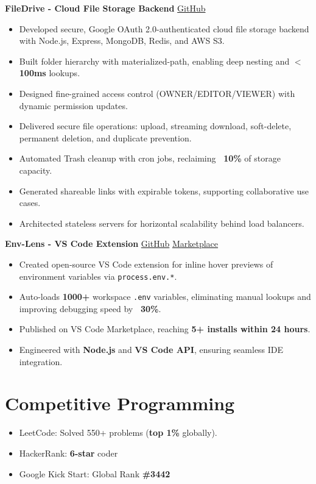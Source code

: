 \documentclass[a4paper,10pt]{article}
\newcommand{\resumeItem}[1]{\item\small{#1}}
\begin{document}
\textbf{FileDrive - Cloud File Storage Backend} \hfill \href{https://github.com/mohankumarkadiri/File-Drive}{GitHub}
\vspace{6pt}
\begin{itemize}[leftmargin=*,itemsep=2pt]
  \resumeItem{Developed secure, Google OAuth 2.0-authenticated cloud file storage backend with Node.js, Express, MongoDB, Redis, and AWS S3.}
  \resumeItem{Built folder hierarchy with materialized-path, enabling deep nesting and \textbf{$<$100ms} lookups.}
  \resumeItem{Designed fine-grained access control (OWNER/EDITOR/VIEWER) with dynamic permission updates.}
  \resumeItem{Delivered secure file operations: upload, streaming download, soft-delete, permanent deletion, and duplicate prevention.}
  \resumeItem{Automated Trash cleanup with cron jobs, reclaiming \textbf{~10\%} of storage capacity.}
  \resumeItem{Generated shareable links with expirable tokens, supporting collaborative use cases.}
  \resumeItem{Architected stateless servers for horizontal scalability behind load balancers.}
\end{itemize}

\vspace{6pt}

\textbf{Env-Lens - VS Code Extension} \hfill
\href{https://github.com/mohankumarkadiri/env-lens}{GitHub} \textbar{} \href{https://marketplace.visualstudio.com/items?itemName=mohankumarkadiri.env-lens&ssr=false}{Marketplace}

\vspace{3pt}
\begin{itemize}[leftmargin=*,itemsep=2pt]
  \resumeItem{Created open-source VS Code extension for inline hover previews of environment variables via \texttt{process.env.*}.}
  \resumeItem{Auto-loads \textbf{1000+} workspace \texttt{.env} variables, eliminating manual lookups and improving debugging speed by \textbf{~30\%}.}
  \resumeItem{Published on VS Code Marketplace, reaching \textbf{5+ installs within 24 hours}.}
  \resumeItem{Engineered with \textbf{Node.js} and \textbf{VS Code API}, ensuring seamless IDE integration.}

\end{itemize}

\section*{Competitive Programming}
\begin{itemize}[leftmargin=*,itemsep=2pt]
  \resumeItem{LeetCode: Solved 550+ problems (\textbf{top 1\%} globally).} 
  \resumeItem{HackerRank: \textbf{6-star} coder}  
  \resumeItem{Google Kick Start: Global Rank \textbf{\#3442}}
\end{itemize}
\end{document}
